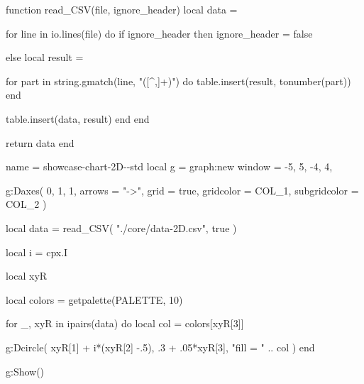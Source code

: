 
\vfill

\begin{luacode*}
function read_CSV(file, ignore_header)
  local data = {}

  for line in io.lines(file) do
    if ignore_header then
      ignore_header = false

    else
      local result = {}

      for part in string.gmatch(line, "([^,]+)") do
        table.insert(result, tonumber(part))
      end

      table.insert(data, result)
    end
  end

  return data
end
\end{luacode*}


\begin{luadraw}{name = showcase-chart-2D-\PALETTE-std}
local g = graph:new{
  window = {-5, 5, -4, 4},
}

g:Daxes(
  {0, 1, 1},
  {
    arrows       = "->",
    grid         = true,
    gridcolor    = COL_1,
    subgridcolor = COL_2
  }
)

local data = read_CSV(
  "./core/data-2D.csv",
  true
)

local i = cpx.I

local xyR

local colors = getpalette(PALETTE, 10)

for _, xyR in ipairs(data) do
  local col = colors[xyR[3]]

  g:Dcircle(
    xyR[1] + i*(xyR[2] -.5), .3 + .05*xyR[3],
    "fill = " .. col
  )
end

g:Show()
\end{luadraw}

